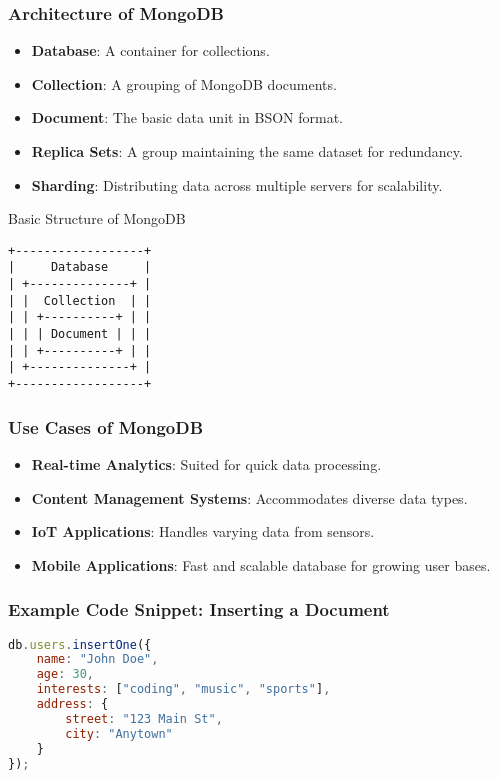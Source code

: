 \documentclass[aspectratio=169]{beamer}
\begin{document}
\begin{frame}[fragile]
    \frametitle{Architecture of MongoDB}
    \begin{itemize}
        \item \textbf{Database}: A container for collections.
        \item \textbf{Collection}: A grouping of MongoDB documents.
        \item \textbf{Document}: The basic data unit in BSON format.
        \item \textbf{Replica Sets}: A group maintaining the same dataset for redundancy.
        \item \textbf{Sharding}: Distributing data across multiple servers for scalability.
    \end{itemize}
    \begin{block}{Basic Structure of MongoDB}
        \begin{verbatim}
+------------------+
|     Database     |
| +--------------+ |
| |  Collection  | |  
| | +----------+ | | 
| | | Document | | | 
| | +----------+ | | 
| +--------------+ |
+------------------+
        \end{verbatim}
    \end{block}
\end{frame}

\begin{frame}[fragile]
    \frametitle{Use Cases of MongoDB}
    \begin{itemize}
        \item \textbf{Real-time Analytics}: Suited for quick data processing.
        \item \textbf{Content Management Systems}: Accommodates diverse data types.
        \item \textbf{IoT Applications}: Handles varying data from sensors.
        \item \textbf{Mobile Applications}: Fast and scalable database for growing user bases.
    \end{itemize}
\end{frame}

\begin{frame}[fragile]
    \frametitle{Example Code Snippet: Inserting a Document}
    \begin{lstlisting}[language=JavaScript]
db.users.insertOne({
    name: "John Doe",
    age: 30,
    interests: ["coding", "music", "sports"],
    address: {
        street: "123 Main St",
        city: "Anytown"
    }
});
    \end{lstlisting}
\end{frame}
\end{document}
